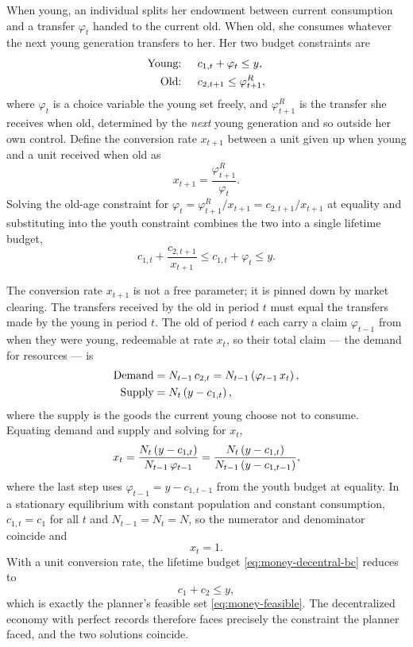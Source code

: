 When young, an individual splits her endowment between current consumption and a transfer $\varphi_t$ handed to the current old. When old, she consumes whatever the next young generation transfers to her. Her two budget constraints are
\[
\begin{aligned}
\text{Young: }\quad & c_{1,t} + \varphi_t \le y,\\
\text{Old: }\quad & c_{2,t+1} \le \varphi_{t+1}^{R},
\end{aligned}
\]
where $\varphi_t$ is a choice variable the young set freely, and $\varphi_{t+1}^{R}$ is the transfer she receives when old, determined by the \emph{next} young generation and so outside her own control. Define the conversion rate $x_{t+1}$ between a unit given up when young and a unit received when old as
\[
x_{t+1} = \frac{\varphi_{t+1}^{R}}{\varphi_t}.
\]
Solving the old-age constraint for $\varphi_t = \varphi_{t+1}^{R}/x_{t+1} = c_{2,t+1}/x_{t+1}$ at equality and substituting into the youth constraint combines the two into a single lifetime budget,
\begin{equation}
c_{1,t} + \frac{c_{2,t+1}}{x_{t+1}} \le c_{1,t} + \varphi_t \le y.
\label{eq:money-decentral-bc}
\end{equation}

The conversion rate $x_{t+1}$ is not a free parameter; it is pinned down by market clearing. The transfers received by the old in period $t$ must equal the transfers made by the young in period $t$. The old of period $t$ each carry a claim $\varphi_{t-1}$ from when they were young, redeemable at rate $x_t$, so their total claim --- the demand for resources --- is
\[
\begin{aligned}
\text{Demand} &= N_{t-1}\, c_{2,t} = N_{t-1}\left(\varphi_{t-1}\, x_t\right),\\
\text{Supply} &= N_t\left(y - c_{1,t}\right),
\end{aligned}
\]
where the supply is the goods the current young choose not to consume. Equating demand and supply and solving for $x_t$,
\[
x_t = \frac{N_t\left(y - c_{1,t}\right)}{N_{t-1}\,\varphi_{t-1}}
    = \frac{N_t\left(y - c_{1,t}\right)}{N_{t-1}\left(y - c_{1,t-1}\right)},
\]
where the last step uses $\varphi_{t-1} = y - c_{1,t-1}$ from the youth budget at equality. In a stationary equilibrium with constant population and constant consumption, $c_{1,t} = c_1$ for all $t$ and $N_{t-1} = N_t = N$, so the numerator and denominator coincide and
\[
x_t = 1.
\]
With a unit conversion rate, the lifetime budget \eqref{eq:money-decentral-bc} reduces to
\[
c_1 + c_2 \le y,
\]
which is exactly the planner's feasible set \eqref{eq:money-feasible}. The decentralized economy with perfect records therefore faces precisely the constraint the planner faced, and the two solutions coincide.

